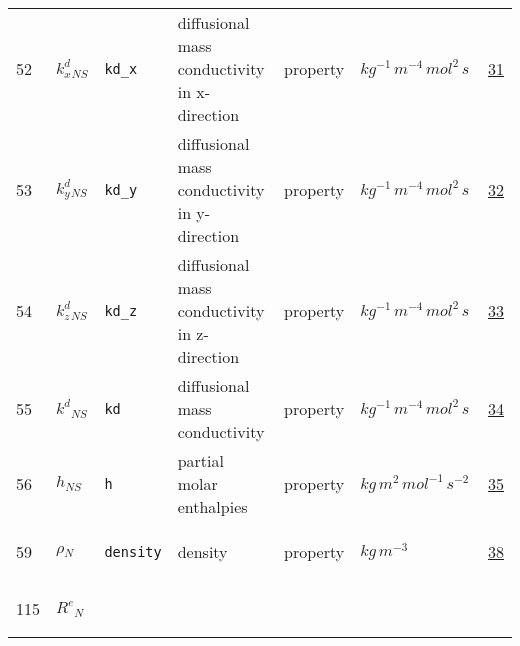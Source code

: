 \begin{longtable}{|p{1cm}|p{2.5cm}|p{4.5cm}|p{8cm}|p{3.0cm}|p{3cm}|p{1cm}|}
                 \\
    52
             & \hypertarget{"v:52"}{ $ {{k^d_x}}{_{{N S}}} $}
             & \verb|kd_x|
             & diffusional mass conductivity in x-direction
             & \begin{lay}property \end{lay}
             & $ kg^{-1} \,m^{-4} \,mol^{2} \,s \, $
             & \hyperlink{"e:31"}{ 31 }
                 \\
    53
             & \hypertarget{"v:53"}{ $ {{k^d_y}}{_{{N S}}} $}
             & \verb|kd_y|
             & diffusional mass conductivity in y-direction
             & \begin{lay}property \end{lay}
             & $ kg^{-1} \,m^{-4} \,mol^{2} \,s \, $
             & \hyperlink{"e:32"}{ 32 }
                 \\
    54
             & \hypertarget{"v:54"}{ $ {{k^d_z}}{_{{N S}}} $}
             & \verb|kd_z|
             & diffusional mass conductivity in z-direction
             & \begin{lay}property \end{lay}
             & $ kg^{-1} \,m^{-4} \,mol^{2} \,s \, $
             & \hyperlink{"e:33"}{ 33 }
                 \\
    55
             & \hypertarget{"v:55"}{ $ {{k^d}}{_{{N S}}} $}
             & \verb|kd|
             & diffusional mass conductivity
             & \begin{lay}property \end{lay}
             & $ kg^{-1} \,m^{-4} \,mol^{2} \,s \, $
             & \hyperlink{"e:34"}{ 34 }
                 \\
    56
             & \hypertarget{"v:56"}{ $ {h}{_{{N S}}} $}
             & \verb|h|
             & partial molar enthalpies
             & \begin{lay}property \end{lay}
             & $ kg \,m^{2} \,mol^{-1} \,s^{-2} \, $
             & \hyperlink{"e:35"}{ 35 }
                 \\
    59
             & \hypertarget{"v:59"}{ $ {\rho}{_{N}} $}
             & \verb|density|
             & density
             & \begin{lay}property \end{lay}
             & $ kg \,m^{-3} \, $
             & \hyperlink{"e:38"}{ 38 }
                 \\
    115
             & \hypertarget{"v:115"}{ $ {{R^e}}{_{N}} $}

\end{longtable}
